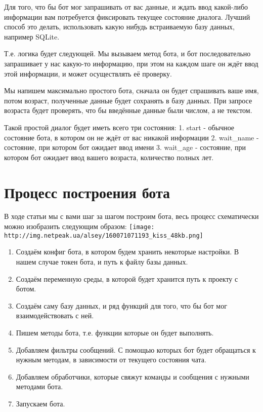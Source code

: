 \documentclass[
]{book}
\providecommand{\tightlist}{%
  \setlength{\itemsep}{0pt}\setlength{\parskip}{0pt}}
\begin{document}
Для того, что бы бот мог запрашивать от вас данные, и ждать ввод какой-либо информации вам потребуется фиксировать текущее состояние диалога. Лучший способ это делать, использовать какую нибудь встраиваемую базу данных, например SQLite.

Т.е. логика будет следующей. Мы вызываем метод бота, и бот последовательно запрашивает у нас какую-то информацию, при этом на каждом шаге он ждёт ввод этой информации, и может осуществлять её проверку.

Мы напишем максимально простого бота, сначала он будет спрашивать ваше имя, потом возраст, полученные данные будет сохранять в базу данных. При запросе возраста будет проверять, что бы введённые данные были числом, а не текстом.

Такой простой диалог будет иметь всего три состояния:
1. start - обычное состояние бота, в котором он не ждёт от вас никакой информации
2. wait\_name - состояние, при котором бот ожидает ввод имени
3. wait\_age - состояние, при котором бот ожидает ввод вашего возраста, количество полных лет.

\hypertarget{ux43fux440ux43eux446ux435ux441ux441-ux43fux43eux441ux442ux440ux43eux435ux43dux438ux44f-ux431ux43eux442ux430}{%
\section{Процесс построения бота}\label{ux43fux440ux43eux446ux435ux441ux441-ux43fux43eux441ux442ux440ux43eux435ux43dux438ux44f-ux431ux43eux442ux430}}

В ходе статьи мы с вами шаг за шагом построим бота, весь процесс схематически можно изобразить следующим образом:
\texttt{[image: http://img.netpeak.ua/alsey/160071071193\_kiss\_48kb.png]}

\begin{enumerate}
\def\labelenumi{\arabic{enumi}.}
\tightlist
\item
  Создаём конфиг бота, в котором будем хранить некоторые настройки. В нашем случае токен бота, и путь к файлу базы данных.
\item
  Создаём переменную среды, в которой будет хранится путь к проекту с ботом.
\item
  Создаём саму базу данных, и ряд функций для того, что бы бот мог взаимодействовать с ней.
\item
  Пишем методы бота, т.е. функции которые он будет выполнять.
\item
  Добавляем фильтры сообщений. С помощью которых бот будет обращаться к нужным методам, в зависимости от текущего состояния чата.
\item
  Добавляем обработчики, которые свяжут команды и сообщения с нужными методами бота.
\item
  Запускаем бота.
\end{enumerate}
\end{document}
